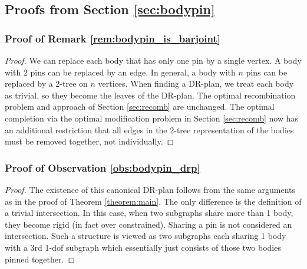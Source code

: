 \subsection{Proofs from Section \ref{sec:bodypin}}

\subsubsection{Proof of Remark \ref{rem:bodypin_is_barjoint}}
\begin{proof}
    We can replace each body that has only one pin by a single vertex. A body with 2 pins can be replaced by an edge. In general, a body with $n$ pins can be replaced by a 2-tree on $n$ vertices. When finding a DR-plan, we treat each body as trivial, so they become the leaves of the DR-plan. The optimal recombination problem and approach of Section \ref{sec:recomb} are unchanged. The optimal completion via the optimal modification problem in Section \ref{sec:recomb} now has an additional restriction that all edges in the 2-tree representation of the bodies must be removed together, not individually.
\end{proof}

\subsubsection{Proof of Observation \ref{obs:bodypin_drp}}
\begin{proof}
    The existence of this canonical DR-plan follows from the same arguments as in the proof of Theorem \ref{theorem:main}. The only difference is the definition of a trivial intersection. In this case, when two subgraphs share more than 1 body, they become rigid (in fact over constrained). Sharing a pin is not considered an intersection. Such a structure is viewed as two subgraphs each sharing 1 body with a 3rd 1-dof subgraph which essentially just consists of those two bodies pinned together.
\end{proof}


